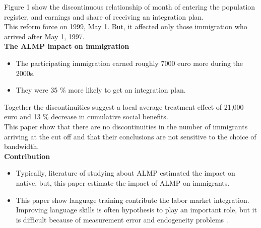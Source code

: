\documentclass[../root]{subfiles}
\begin{document}
    Figure 1 show the discontinuous relationship of month of entering the population register, and earnings and share of receiving an integration plan.  \\  
    This reform force on 1999, May 1. But, it affected only those immigration who arrived after May 1, 1997. \\
    {\bf The ALMP impact on immigration }
    \begin{itemize}
        \item The participating immigration earned roughly 7000 euro more during the 2000s.
        \item They were 35 \% more likely to get an integration plan.
    \end{itemize}
        Together the discontinuities suggest a local average treatment effect of 21,000 euro and 13 \% decrease in cumulative social benefits. \\
        
        This paper show that there are no discontinuities in the number of immigrants arriving at the cut off and that their conclusions are not sensitive to the choice of bandwidth. \\
    
    {\bf Contribution} 
    \begin{itemize}
        \item Typically, literature of studying about ALMP estimated the impact on native, but, this paper estimate the impact of ALMP on immigrants.
        \item This paper show language training contribute the labor market integration. Improving language skills is often hypothesis to play an important role, but it is difficult because of measurement error and endogeneity problems . 
    \end{itemize}
    
\end{document}
